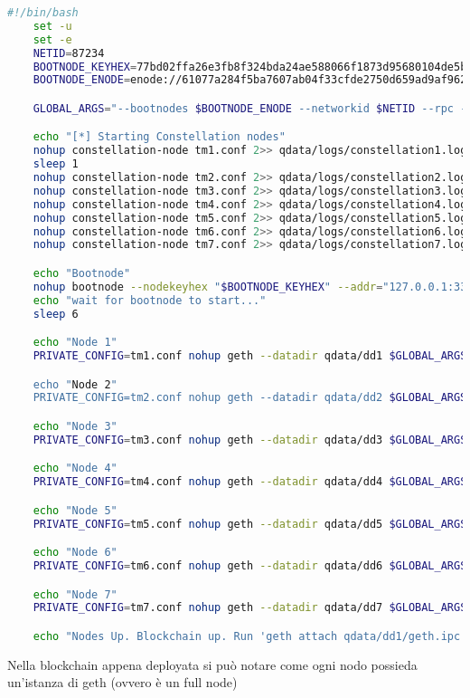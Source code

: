 \begin{center}
	\begin{lstlisting}[language=sh,caption={Script di avvio della blockchain Quorum},captionpos=b,frame=lines,basicstyle=\linespread{0.8}\small]
	#!/bin/bash
	set -u
	set -e
	NETID=87234
	BOOTNODE_KEYHEX=77bd02ffa26e3fb8f324bda24ae588066f1873d95680104de5bc2db9e7b2e510
	BOOTNODE_ENODE=enode://61077a284f5ba7607ab04f33cfde2750d659ad9af962516e159cf6ce708646066cd927a900944ce393b98b95c914e4d6c54b099f568342647a1cd4a262cc0423@[127.0.0.1]:33445

	GLOBAL_ARGS="--bootnodes $BOOTNODE_ENODE --networkid $NETID --rpc --rpcaddr 0.0.0.0 --rpcapi admin,db,eth,debug,miner,net,shh,txpool,personal,web3,quorum"

	echo "[*] Starting Constellation nodes"
	nohup constellation-node tm1.conf 2>> qdata/logs/constellation1.log &
	sleep 1
	nohup constellation-node tm2.conf 2>> qdata/logs/constellation2.log &
	nohup constellation-node tm3.conf 2>> qdata/logs/constellation3.log &
	nohup constellation-node tm4.conf 2>> qdata/logs/constellation4.log &
	nohup constellation-node tm5.conf 2>> qdata/logs/constellation5.log &
	nohup constellation-node tm6.conf 2>> qdata/logs/constellation6.log &
	nohup constellation-node tm7.conf 2>> qdata/logs/constellation7.log &

	echo "Bootnode"
	nohup bootnode --nodekeyhex "$BOOTNODE_KEYHEX" --addr="127.0.0.1:33445" 2>>qdata/logs/bootnode.log &
	echo "wait for bootnode to start..."
	sleep 6

	echo "Node 1"
	PRIVATE_CONFIG=tm1.conf nohup geth --datadir qdata/dd1 $GLOBAL_ARGS --rpcport 22000 --port 21000 --unlock "0xed9d02e382b34818e88b88a309c7fe71e65f419d" --password passwords.txt --voteaccount "0x0638e15747$

	echo "Node 2"
	PRIVATE_CONFIG=tm2.conf nohup geth --datadir qdata/dd2 $GLOBAL_ARGS --rpcport 22001 --port 21001 --voteaccount "0x0fbdc686b912d7722dc86510934589e0aaf3b55a" --votepassword "" --blockmakeraccount "0xca8435$

	echo "Node 3"
	PRIVATE_CONFIG=tm3.conf nohup geth --datadir qdata/dd3 $GLOBAL_ARGS --rpcport 22002 --port 21002 2>>qdata/logs/3.log &

	echo "Node 4"
	PRIVATE_CONFIG=tm4.conf nohup geth --datadir qdata/dd4 $GLOBAL_ARGS --rpcport 22003 --port 21003 --voteaccount "0x9186eb3d20cbd1f5f992a950d808c4495153abd5" --votepassword "" 2>>qdata/logs/4.log &

	echo "Node 5"
	PRIVATE_CONFIG=tm5.conf nohup geth --datadir qdata/dd5 $GLOBAL_ARGS --rpcport 22004 --port 21004 2>>qdata/logs/5.log &

	echo "Node 6"
	PRIVATE_CONFIG=tm6.conf nohup geth --datadir qdata/dd6 $GLOBAL_ARGS --rpcport 22005 --port 21005 2>>qdata/logs/6.log &

	echo "Node 7"
	PRIVATE_CONFIG=tm7.conf nohup geth --datadir qdata/dd7 $GLOBAL_ARGS --rpcport 22006 --port 21006 2>>qdata/logs/7.log &

	echo "Nodes Up. Blockchain up. Run 'geth attach qdata/dd1/geth.ipc' to attach to the first Geth node"
	\end{lstlisting}
\end{center}
Nella blockchain appena deployata si può notare come ogni nodo possieda un'istanza di geth (ovvero è un full node)